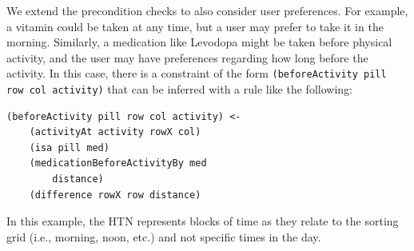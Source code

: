 \documentclass[letterpaper]{article} %
\begin{document}
We extend the precondition checks to also consider user preferences.  
For example, a vitamin could be taken at any time, but a user may prefer to take it in the morning.  Similarly, a medication like Levodopa might be taken before physical activity, and the user may have preferences regarding how long before the activity.  In this case, there is a constraint of the form \texttt{(beforeActivity pill row col activity)} that can be inferred with a rule like the following:

\small{
\begin{verbatim}
(beforeActivity pill row col activity) <-
    (activityAt activity rowX col)
    (isa pill med)
    (medicationBeforeActivityBy med 
        distance)
    (difference rowX row distance)
\end{verbatim}}

In this example, the HTN represents blocks of time as they relate to the sorting grid (i.e., morning, noon, etc.) and not specific times in the day.






\end{document}
